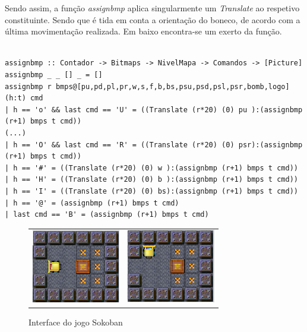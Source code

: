 \documentclass[12pt,a4paper]{report}
\begin{document}
\hfill

\hfill

Sendo assim, a função \emph{assignbmp} aplica singularmente um \emph{Translate} ao respetivo constituinte. 
Sendo que é tida em conta a orientação do boneco, de acordo com a última movimentação realizada.
Em baixo encontra-se um exerto da função.\\

\begin{verbatim}

assignbmp :: Contador -> Bitmaps -> NivelMapa -> Comandos -> [Picture]
assignbmp _ _ [] _ = []
assignbmp r bmps@[pu,pd,pl,pr,w,s,f,b,bs,psu,psd,psl,psr,bomb,logo] (h:t) cmd
| h == 'o' && last cmd == 'U' = ((Translate (r*20) (0) pu ):(assignbmp (r+1) bmps t cmd))
(...) 
| h == 'O' && last cmd == 'R' = ((Translate (r*20) (0) psr):(assignbmp (r+1) bmps t cmd))
| h == '#' = ((Translate (r*20) (0) w ):(assignbmp (r+1) bmps t cmd))
| h == 'H' = ((Translate (r*20) (0) b ):(assignbmp (r+1) bmps t cmd))
| h == 'I' = ((Translate (r*20) (0) bs):(assignbmp (r+1) bmps t cmd))
| h == '@' = (assignbmp (r+1) bmps t cmd)
| last cmd == 'B' = (assignbmp (r+1) bmps t cmd) 

\end{verbatim}

\hfill

\begin{figure}[htb]
\centering
  \begin{tabular}{@{}cc@{}}
    \includegraphics[scale=0.95]{images/print9.png} &
    \includegraphics[scale=0.95]{images/print10.png}
  \end{tabular}
  \caption{Interface do jogo Sokoban}
\end{figure}
\end{document}
